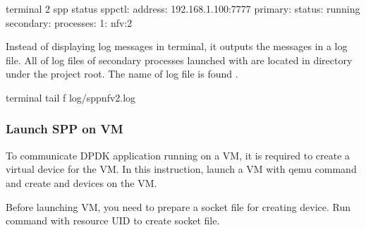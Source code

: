 \documentclass[a4paper,11pt,openany,oneside,english]{sphinxmanual}
\begin{document}
\begin{sphinxVerbatim}[commandchars=\\\{\},formatcom=\footnotesize]
\PYGZsh{} terminal 2
spp \PYGZgt{} status
\PYGZhy{} spp\PYGZhy{}ctl:
  \PYGZhy{} address: 192.168.1.100:7777
\PYGZhy{} primary:
  \PYGZhy{} status: running
\PYGZhy{} secondary:
  \PYGZhy{} processes:
    1: nfv:2
\end{sphinxVerbatim}

Instead of displaying log messages in terminal, it outputs the messages
in a log file. All of log files of secondary processes launched with
 are located in  directory under the project root.
The name of log file is found .

\begin{sphinxVerbatim}[commandchars=\\\{\},formatcom=\footnotesize]
 terminal 
 tail \PYGZhy{}f log/spp\PYGZus{}nfv\PYGZhy{}2.log
\end{sphinxVerbatim}


\subsubsection{Launch SPP on VM}
\label{\detokenize{gsg/howto_use:launch-spp-on-vm}}
To communicate DPDK application running on a VM,
it is required to create a virtual device for the VM.
In this instruction, launch a VM with qemu command and
create  and  devices on the VM.

Before launching VM, you need to prepare a socket file for creating
 device.
Run  command with resource UID  to create socket file.
\end{document}
